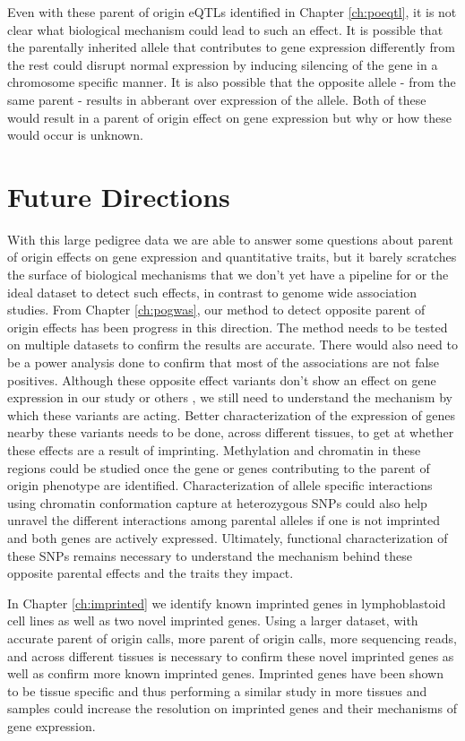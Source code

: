 Even with these parent of origin eQTLs identified in Chapter \ref{ch:poeqtl}, it is not clear what biological mechanism could lead to such an effect. It is possible that the parentally inherited allele that contributes to gene expression differently from the rest could disrupt normal expression by inducing silencing of the gene in a chromosome specific manner. It is also possible that the opposite allele - from the same parent - results in abberant over expression of the allele. Both of these would result in a parent of origin effect on gene expression but why or how these would occur is unknown. 

\section{Future Directions}

With this large pedigree data we are able to answer some questions about parent of origin effects on gene expression and quantitative traits, but it barely scratches the surface of biological mechanisms that we don't yet have a pipeline for or the ideal dataset to detect such effects, in contrast to genome wide association studies. From Chapter \ref{ch:pogwas}, our method to detect opposite parent of origin effects has been progress in this direction. The method needs to be tested on multiple datasets to confirm the results are accurate. There would also need to be a power analysis done to confirm that most of the associations are not false positives. Although these opposite effect variants don't show an effect on gene expression in our study or others \cite{Benonisdottir:2016dz}, we still need to understand the mechanism by which these variants are acting. Better characterization of the expression of genes nearby these variants needs to be done, across different tissues, to get at whether these effects are a result of imprinting. Methylation and chromatin in these regions could be studied once the gene or genes contributing to the parent of origin phenotype are identified. Characterization of allele specific interactions using chromatin conformation capture at heterozygous SNPs could also help unravel the different interactions among parental alleles if one is not imprinted and both genes are actively expressed. Ultimately, functional characterization of these SNPs remains necessary to understand the mechanism behind these opposite parental effects and the traits they impact.

In Chapter \ref{ch:imprinted} we identify known imprinted genes in lymphoblastoid cell lines as well as two novel imprinted genes. Using a larger dataset, with accurate parent of origin calls, more parent of origin calls, more sequencing reads, and across different tissues is necessary to confirm these novel imprinted genes as well as confirm more known imprinted genes. Imprinted genes have been shown to be tissue specific \cite{Baran:2015cx} and thus performing a similar study in more tissues and samples could increase the resolution on imprinted genes and their mechanisms of gene expression. 


